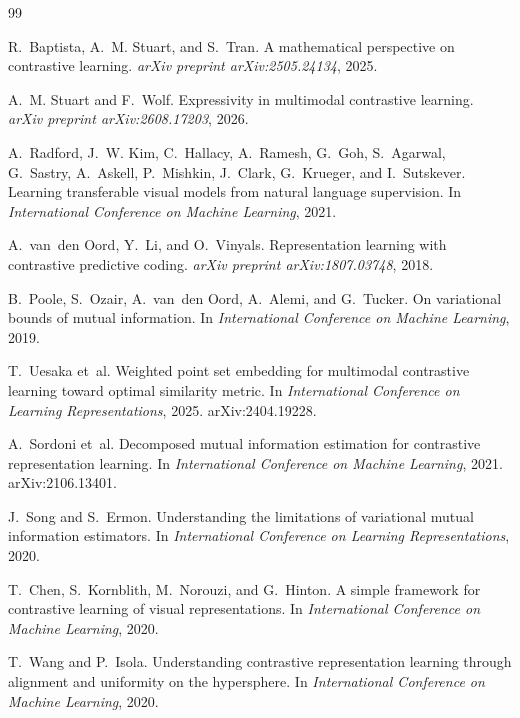 \documentclass[11pt]{article}
\theoremstyle{plain}
\theoremstyle{definition}
\theoremstyle{remark}
\begin{document}
\begin{thebibliography}{99}

R.~Baptista, A.~M. Stuart, and S.~Tran.
\newblock A mathematical perspective on contrastive learning.
\newblock \emph{arXiv preprint arXiv:2505.24134}, 2025.

A.~M. Stuart and F.~Wolf.
\newblock Expressivity in multimodal contrastive learning.
\newblock \emph{arXiv preprint arXiv:2608.17203}, 2026.

A.~Radford, J.~W. Kim, C.~Hallacy, A.~Ramesh, G.~Goh, S.~Agarwal, G.~Sastry,
 A.~Askell, P.~Mishkin, J.~Clark, G.~Krueger, and I.~Sutskever.
\newblock Learning transferable visual models from natural language
 supervision.
\newblock In \emph{International Conference on Machine Learning}, 2021.

A.~van~den Oord, Y.~Li, and O.~Vinyals.
\newblock Representation learning with contrastive predictive coding.
\newblock \emph{arXiv preprint arXiv:1807.03748}, 2018.

B.~Poole, S.~Ozair, A.~van~den Oord, A.~Alemi, and G.~Tucker.
\newblock On variational bounds of mutual information.
\newblock In \emph{International Conference on Machine Learning}, 2019.

T.~Uesaka et~al.
\newblock Weighted point set embedding for multimodal contrastive learning
 toward optimal similarity metric.
\newblock In \emph{International Conference on Learning Representations},
 2025. arXiv:2404.19228.

A.~Sordoni et~al.
\newblock Decomposed mutual information estimation for contrastive
 representation learning.
\newblock In \emph{International Conference on Machine Learning}, 2021.
 arXiv:2106.13401.

J.~Song and S.~Ermon.
\newblock Understanding the limitations of variational mutual information
 estimators.
\newblock In \emph{International Conference on Learning Representations},
 2020.

T.~Chen, S.~Kornblith, M.~Norouzi, and G.~Hinton.
\newblock A simple framework for contrastive learning of visual
 representations.
\newblock In \emph{International Conference on Machine Learning}, 2020.

T.~Wang and P.~Isola.
\newblock Understanding contrastive representation learning through alignment
 and uniformity on the hypersphere.
\newblock In \emph{International Conference on Machine Learning}, 2020.


\end{thebibliography}
\end{document}
